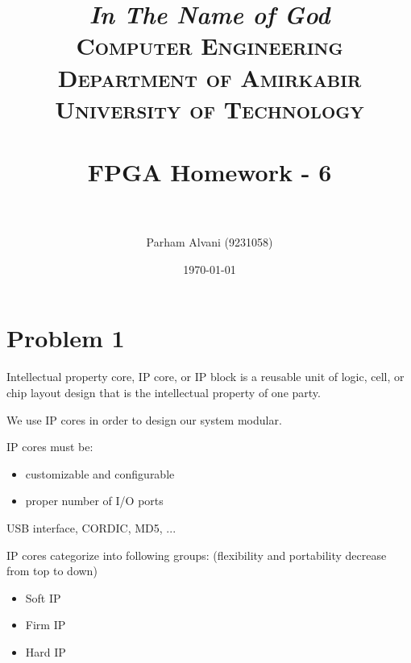 \documentclass[paper=a4, fontsize=11pt]{scrartcl} %
\title{
\normalfont \normalsize
\textit{In The Name of God} \\
\textsc{Computer Engineering Department of Amirkabir University of Technology} \\ [25pt]
\horrule{0.5pt} \\[0.4cm] %
\huge FPGA Homework - 6 \\ %
\horrule{2pt} \\[0.5cm] %
}
\author{Parham Alvani (9231058)}
\date{\normalsize\today}
\numberwithin{equation}{section} %
\numberwithin{figure}{section} %
\numberwithin{table}{section} %
\begin{document}
\maketitle


\section{Problem 1}
\par Intellectual property core, IP core, or IP block is a reusable unit of
logic, cell, or chip layout design that is the intellectual property of one party.
\par We use IP cores in order to design our system modular.
\par IP cores must be:
\begin{itemize}
	\item
		customizable and configurable
	\item
		proper number of I/O ports
\end{itemize}
\par USB interface, CORDIC, MD5, ...
\par IP cores categorize into following groups:
(flexibility and portability decrease from top to down)
\begin{itemize}
	\item
		Soft IP
	\item
		Firm IP
	\item
		Hard IP
\end{itemize}
\end{document}

